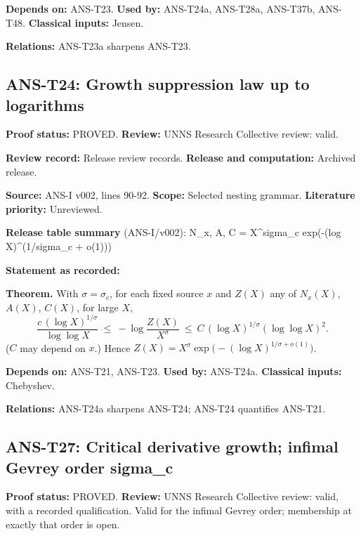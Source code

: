 \documentclass[
  11pt,
]{article}
\begin{document}
\textbf{Depends on:} ANS-T23. \textbf{Used by:} ANS-T24a, ANS-T28a,
ANS-T37b, ANS-T48. \textbf{Classical inputs:} Jensen.

\textbf{Relations:} ANS-T23a sharpens ANS-T23.

\hypertarget{ans-t24-growth-suppression-law-up-to-logarithms}{%
\subsection{ANS-T24: Growth suppression law up to
logarithms}\label{ans-t24-growth-suppression-law-up-to-logarithms}}

\textbf{Proof status:} PROVED. \textbf{Review:} UNNS Research Collective
review: valid.

\textbf{Review record:} Release review records. \textbf{Release and
computation:} Archived release.

\textbf{Source:} ANS-I v002, lines 90-92. \textbf{Scope:} Selected
nesting grammar. \textbf{Literature priority:} Unreviewed.

\textbf{Release table summary} (ANS-I/v002): N\_x, A, C = X\^{}sigma\_c
exp(-(log X)\^{}(1/sigma\_c + o(1)))

\textbf{Statement as recorded:}

\textbf{Theorem.} With \(\sigma=\sigma_c\), for each fixed source \(x\)
and \(Z(X)\) any of \(N_x(X)\), \(A(X)\), \(C(X)\), for large \(X\),
\[\frac{c\,(\log X)^{1/\sigma}}{\log\log X}\ \le\ -\log\frac{Z(X)}{X^{\sigma}}\ \le\ C\,(\log X)^{1/\sigma}(\log\log X)^2 .\]
(\(C\) may depend on \(x\).) Hence
\(Z(X)=X^{\sigma}\exp\big(-(\log X)^{1/\sigma+o(1)}\big)\).

\textbf{Depends on:} ANS-T21, ANS-T23. \textbf{Used by:} ANS-T24a.
\textbf{Classical inputs:} Chebyshev.

\textbf{Relations:} ANS-T24a sharpens ANS-T24; ANS-T24 quantifies
ANS-T21.

\hypertarget{ans-t27-critical-derivative-growth-infimal-gevrey-order-sigma_c}{%
\subsection{ANS-T27: Critical derivative growth; infimal Gevrey order
sigma\_c}\label{ans-t27-critical-derivative-growth-infimal-gevrey-order-sigma_c}}

\textbf{Proof status:} PROVED. \textbf{Review:} UNNS Research Collective
review: valid, with a recorded qualification. Valid for the infimal
Gevrey order; membership at exactly that order is open.
\end{document}
